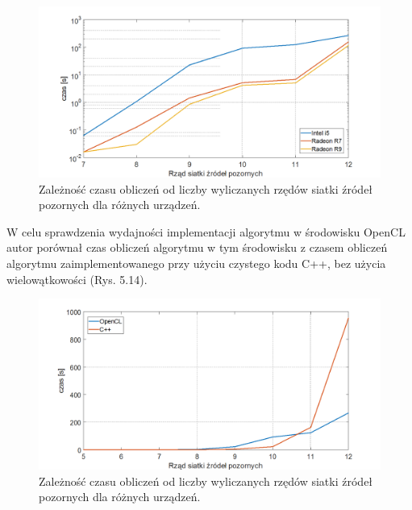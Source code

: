 \begin{figure}[h]
        \centering
                \centering
                \includegraphics[width=16cm]{wykres}
	\caption{Zależność czasu obliczeń od liczby wyliczanych rzędów siatki źródeł pozornych dla różnych urządzeń.}
\end{figure}

W celu sprawdzenia wydajności implementacji algorytmu w środowisku OpenCL autor porównał czas obliczeń algorytmu w tym środowisku z czasem obliczeń algorytmu zaimplementowanego przy użyciu czystego kodu C++, bez użycia wielowątkowości (Rys. 5.14).

\begin{figure}[h]
        \centering
                \centering
                \includegraphics[width=16cm]{wykres2}
	\caption{Zależność czasu obliczeń od liczby wyliczanych rzędów siatki źródeł pozornych dla różnych urządzeń.}
\end{figure}














